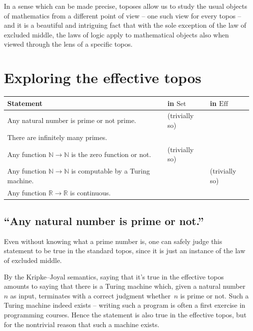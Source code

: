 \documentclass[oneside]{amsart}
\newcommand{\cmark}{\ding{51}}
\newcommand{\xmark}{\ding{55}}
\theoremstyle{definition}
\theoremstyle{plain}
\theoremstyle{remark}
\newcommand{\NN}{\mathbb{N}}
\newcommand{\RR}{\mathbb{R}}
\newcommand{\Set}{\mathrm{Set}}
\newcommand{\Eff}{\mathrm{Ef{}f}}
\renewcommand{\_}{\mathpunct{.}\,}
\newcommand{\effective}{ef{}fective\xspace}
\newcommand{\?}{\,{:}\,}
\begin{document}
In a sense which can be made precise, toposes allow us to study the usual
objects of mathematics from a different point of view -- one such view for
every topos -- and it is a beautiful and intriguing fact that with the sole
exception of the law of excluded middle, the laws of logic apply to
mathematical objects also when viewed through the lens of a specific topos.



\section{Exploring the \effective topos}


\begin{tabular}{lll}
  \toprule
  Statement & in $\Set$ & in $\Eff$ \\
  \midrule
  Any natural number is prime or not prime. & \cmark{} (trivially so) & \cmark \\
  There are infinitely many primes. & \cmark & \cmark \\
  Any function $\NN \to \NN$ is the zero function or not. & \cmark{} (trivially so) & \xmark \\
  Any function $\NN \to \NN$ is computable by a Turing machine. & \xmark & \cmark{} (trivially so) \\
  Any function $\RR \to \RR$ is continuous. & \xmark & \cmark \\
  \bottomrule
\end{tabular}

\subsection{``Any natural number is prime or not.''} Even without knowing what
a prime number is, one can safely judge this statement to be true in
the standard topos, since it is just an instance of the law of excluded middle.

By the Kripke--Joyal semantics, saying that it's true in the \effective topos
amounts to saying that there is a Turing machine which, given a natural
number~$n$ as input, terminates with a correct judgment whether~$n$ is prime or
not. Such a Turing machine indeed exists -- writing such a program is often a
first exercise in programming courses. Hence the statement is also true in the
\effective topos, but for the nontrivial reason that such a machine exists.
\end{document}
